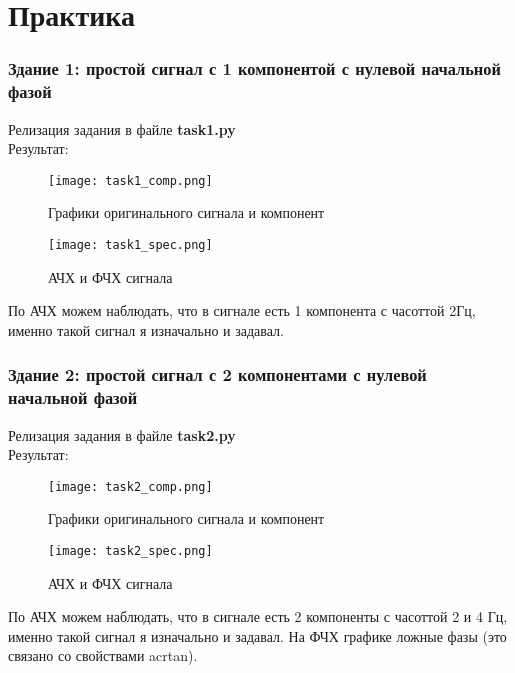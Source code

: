 \chapter{Практика}
\label{ch:chap2}

\subsection*{\textbf{Здание 1: простой сигнал с 1 компонентой с нулевой начальной фазой}}

Релизация задания в файле \textbf{task1.py} \\

Результат: \\

\begin{figure}[H]
    \centering
    \texttt{[image: task1\_comp.png]}
    \caption{Графики оригинального сигнала и компонент}
\end{figure}

\begin{figure}[H]
    \centering
    \texttt{[image: task1\_spec.png]}
    \caption{АЧХ и ФЧХ сигнала}
\end{figure}

По АЧХ можем наблюдать, что в сигнале есть 1 компонента с часоттой 2Гц, именно такой сигнал
я изначально и задавал.

\subsection*{\textbf{Здание 2: простой сигнал с 2 компонентами с нулевой начальной фазой}}

Релизация задания в файле \textbf{task2.py} \\

Результат: \\

\begin{figure}[H]
    \centering
    \texttt{[image: task2\_comp.png]}
    \caption{Графики оригинального сигнала и компонент}
\end{figure}

\begin{figure}[H]
    \centering
    \texttt{[image: task2\_spec.png]}
    \caption{АЧХ и ФЧХ сигнала}
\end{figure}

По АЧХ можем наблюдать, что в сигнале есть 2 компоненты с часоттой 2 и 4 Гц, именно такой сигнал
я изначально и задавал. На ФЧХ графике ложные фазы (это связано со свойствами acrtan).

